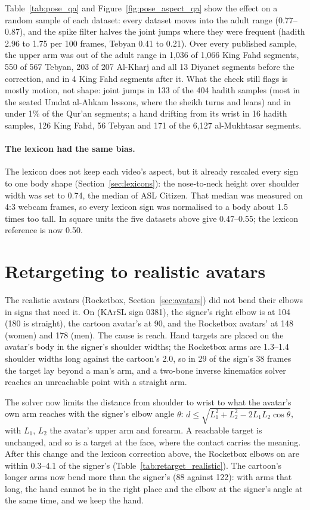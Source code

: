 Table~\ref{tab:pose_qa} and Figure~\ref{fig:pose_aspect_qa} show the effect on a random sample of each dataset: every
dataset moves into the adult range (0.77--0.87), and the spike filter halves the joint jumps where they were frequent
(hadith 2.96 to 1.75 per 100 frames, Tebyan 0.41 to 0.21). Over every published sample, the upper arm was out of
the adult range in 1,036 of 1,066 King Fahd segments, 550 of 567 Tebyan, 203 of 207 Al-Kharj and all 13 Diyanet
segments before the correction, and in 4 King Fahd segments after it. What the check still flags is mostly motion,
not shape: joint jumps in 133 of the 404 hadith samples (most in the seated Umdat al-Ahkam lessons, where the
sheikh turns and leans) and in under 1\% of the Qur'an segments; a hand drifting from its wrist in 16 hadith samples,
126 King Fahd, 56 Tebyan and 171 of the 6,127 al-Mukhtasar segments.

\paragraph{The lexicon had the same bias.} The lexicon does not keep each video's aspect, but it already rescaled every
sign to one body shape (Section~\ref{sec:lexicons}): the nose-to-neck height over shoulder width was set to 0.74, the
median of ASL Citizen. That median was measured on 4:3 webcam frames, so every lexicon sign was normalised to a body
about 1.5 times too tall. In square units the five datasets above give 0.47--0.55; the lexicon reference is now 0.50.

\section{Retargeting to realistic avatars}
\label{sec:retarget_realistic}
The realistic avatars (Rocketbox, Section~\ref{sec:avatars}) did not bend their elbows in signs that need it. On
 (KArSL sign 0381), the signer's right elbow is at 104\textdegree{} (180\textdegree{} is straight), the cartoon
avatar's at 90\textdegree{}, and the Rocketbox avatars' at 148\textdegree{} (women) and 178\textdegree{} (men). The cause
is reach. Hand targets are placed on the avatar's body in the signer's shoulder widths; the Rocketbox arms are 1.3--1.4
shoulder widths long against the cartoon's 2.0, so in 29 of the sign's 38 frames the target lay beyond a man's arm, and
a two-bone inverse kinematics solver reaches an unreachable point with a straight arm.

The solver now limits the distance from shoulder to wrist to what the avatar's own arm reaches with the signer's elbow
angle $\theta$: $d \le \sqrt{L_1^2 + L_2^2 - 2 L_1 L_2 \cos\theta}$, with $L_1$, $L_2$ the avatar's upper arm and
forearm. A reachable target is unchanged, and so is a target at the face, where the contact carries the meaning. After
this change and the lexicon correction above, the Rocketbox elbows on  are within 0.3--4.1\textdegree{} of the
signer's (Table~\ref{tab:retarget_realistic}). The cartoon's longer arms now bend more than the signer's
(88\textdegree{} against 122\textdegree{}): with arms that long, the hand cannot be in the right place and the elbow at
the signer's angle at the same time, and we keep the hand.

